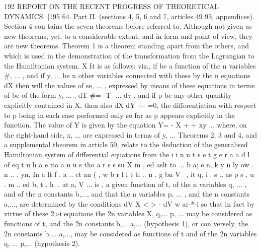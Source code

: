 \documentclass[12pt,a4paper]{article}
\theoremstyle{definition}
\begin{document}

192 REPORT ON THE RECENT PROGRESS OF THEORETICAL DYNAMICS.
[195
64. Part II. (sections 4, 5, 6 and 7, articles 49 93, appendices). Section 4 con
tains the seven theorems before referred to. Although not given as new theorems, yet,
to a considerable extent, and in form and point of view, they are new theorems.
Theorem 1 is a theorem standing apart from the others, and which is used in
the demonstration of the transformation from the Lagrangian to the Hamiltonian system.
X
It is as follows: viz., if be a function of the n variables #, ... , and if y, ... be
n other variables connected with these by the n equations
dX
then will the values of se, ... , expressed by means of these equations in terms of
be of the form
y, ... ,
dT
#=
-T- ...
dy ,
and if p be any other quantity explicitly contained in X, then also
dX dY
+- =0,
the differentiation with respect to p being in each case performed only so far as p
appears explicitly in the function.
The value of Y is given by the equation
Y= - X + +
xy ...
where, on the right-hand side, x, ... are expressed in terms of y, ...
Theorems 2, 3 and 4, and a supplemental theorem in article 50, relate to the
deduction of the generalised Hamiltonian system of differential equations from the
i i n n t s e t g e r a a d l of eq t u h a e tio a n u s tho a r s s su X m , ed aslt to ... b a; e n, k y n ly ow . n .. . yn, In a lt f . a .. ct an ( , w b r l i t ti .. n . g bn V \ , it q, i . s .. as p s , u . m .. ed b, t . h .. at a, V ... is ,
a given function of t, of the n variables q, ... , and of the n constants b,..., and that
the n variables p, ... , and the n constants a,..., are determined by the conditions
dV
X
< >
-%
dV w
ar-*-i
so that in fact by virtue of these 2>i equations the 2n variables X, q,... p, ... may be
considered as functions of t, and the 2n constants b,... a,... (hypothesis 1), or con
versely, the 2n constants b,... a,..., may be considered as functions of t and of the
2n variables q, ... p,... (hypothesis 2).


\end{document}

